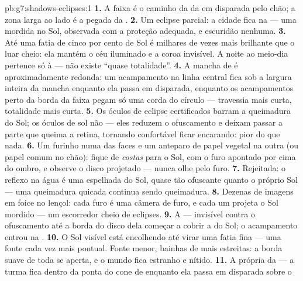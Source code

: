 \begin{solution}{pb:g7:shadows-eclipses:1}
\textbf{1.} A faixa é o caminho da  da  em disparada pelo
chão; a zona larga ao lado é a pegada da .
\textbf{2.} Um eclipse parcial: a cidade fica na  --- uma
mordida no Sol, observada com a proteção adequada, e escuridão
nenhuma.
\textbf{3.} Até uma fatia de cinco por cento de Sol é milhares de
vezes mais brilhante que o luar cheio: ela mantém o céu iluminado e a
coroa invisível. A noite ao meio-dia pertence só à  --- não
existe ``quase totalidade''.
\textbf{4.} A mancha de  é aproximadamente redonda: um
acampamento na linha central fica sob a largura inteira da mancha
enquanto ela passa em disparada, enquanto os acampamentos perto da
borda da faixa pegam só uma corda do círculo --- travessia mais
curta, totalidade mais curta.
\textbf{5.} Os óculos de eclipse certificados barram a queimadura do
Sol; os óculos de sol não --- eles reduzem o ofuscamento e deixam
passar a parte que queima a retina, tornando confortável ficar
encarando: pior do que nada.
\textbf{6.} Um furinho numa das faces e um anteparo de papel vegetal
na outra (ou papel comum no chão): fique de \emph{costas} para o Sol,
com o furo apontado por cima do ombro, e observe o disco projetado
--- nunca olhe pelo furo.
\textbf{7.} Rejeitada: o reflexo na água é uma  espelhada do
Sol, quase tão ofuscante quanto o próprio Sol --- uma queimadura
quicada continua sendo queimadura.
\textbf{8.} Dezenas de imagens em foice no lençol: cada furo é uma
câmera de furo, e cada um projeta o Sol mordido --- um escorredor
cheio de eclipses.
\textbf{9.} A  --- invisível contra o ofuscamento até a borda do
disco dela começar a cobrir a do Sol; o acampamento entrou na
.
\textbf{10.} O Sol visível está encolhendo até virar uma fatia fina
--- uma fonte cada vez mais pontual. Fonte menor, bainhas de 
mais estreitas: a borda suave de toda  se aperta, e o mundo
fica estranho e nítido.
\textbf{11.} A própria  da  --- a turma fica dentro da ponta
do cone de  enquanto ela passa em disparada sobre o

\end{solution}
